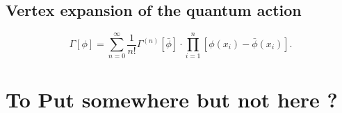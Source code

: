 \subsection{Vertex expansion of the quantum action}
\begin{mybox}{}
	\begin{equation}
		\Gamma[\phi] = \sum_{n=0}^{\infty} \frac{1}{n!}\Gamma^{(n)}[\bar{ \phi}] \cdot \prod_{i=1}^{n} \left[\phi(x_i)-\bar{ \phi}(x_i)\right].
	\end{equation}
\end{mybox}


\section{To Put somewhere but not here ?}






























